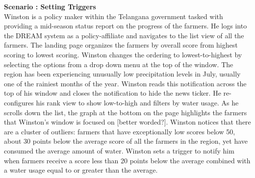\begin{flushleft}
\textbf{Scenario : Setting Triggers}\\\smallskip
Winston is a policy maker within the Telangana government tasked with providing a mid-season status report on the progress of the farmers. He logs into the DREAM system as a policy-affiliate and navigates to the list view of all the farmers. The landing page organizes the farmers by overall score from highest scoring to lowest scoring. Winston changes the ordering to lowest-to-highest by selecting the options from a drop down menu at the top of the window. The region has been experiencing unusually low precipitation levels in July, usually one of the rainiest months of the year. Winston reads this notification across the top of his window and closes the notification to hide the news ticker. He re-configures his rank view to show low-to-high and filters by water usage. As he scrolls down the list, the graph at the bottom on the page highlights the farmers that Winston's window is focused on [better worded?]. Winston notices that there are a cluster of outliers: farmers that have exceptionally low scores below 50, about 30 points below the average score of all the farmers in the region, yet have consumed the average amount of water. Winston sets a trigger to notify him when farmers receive a score less than 20 points below the average combined with a water usage equal to or greater than the average. 
\end{flushleft}
